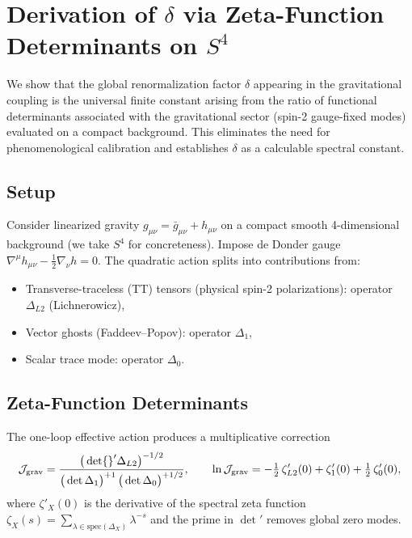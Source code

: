 \documentclass{article}
\numberwithin{equation}{section}
\theoremstyle{plain}
\theoremstyle{definition}
\theoremstyle{remark}
\begin{document}
\section{Derivation of \texorpdfstring{$\delta$}{δ} via Zeta-Function Determinants on \texorpdfstring{$S^4$}{S4}}
\label{app:zeta_S4}

We show that the global renormalization factor $\delta$ appearing in the gravitational coupling is the universal finite constant arising from the ratio of functional determinants associated with the gravitational sector (spin-2 gauge-fixed modes) evaluated on a compact background. This eliminates the need for phenomenological calibration and establishes $\delta$ as a calculable spectral constant.

\subsection{Setup}
Consider linearized gravity $g_{\mu\nu}=\bar{g}_{\mu\nu}+h_{\mu\nu}$ on a compact smooth 4-dimensional background (we take $S^4$ for concreteness). Impose de Donder gauge $\nabla^\mu h_{\mu\nu}-\tfrac{1}{2}\nabla_\nu h=0$. The quadratic action splits into contributions from:
\begin{itemize}
    \item Transverse-traceless (TT) tensors (physical spin-2 polarizations): operator $\Delta_{L2}$ (Lichnerowicz),
    \item Vector ghosts (Faddeev–Popov): operator $\Delta_1$,
    \item Scalar trace mode: operator $\Delta_0$.
\end{itemize}

\subsection{Zeta-Function Determinants}
The one-loop effective action produces a multiplicative correction
\begin{equation}
\mathcal{J}_{\rm grav}
= \frac{\big(\det{}' \Delta_{L2}\big)^{-1/2}}{\big(\det \Delta_{1}\big)^{+1}\,\big(\det \Delta_{0}\big)^{+1/2}},
\qquad
\ln \mathcal{J}_{\rm grav}
= -\tfrac{1}{2}\,\zeta'_{L2}(0)+\zeta'_1(0)+\tfrac{1}{2}\,\zeta'_0(0),
\label{eq:Jgrav_def}
\end{equation}
where $\zeta'_X(0)$ is the derivative of the spectral zeta function $\zeta_X(s)=\sum_{\lambda\in \text{spec}(\Delta_X)} \lambda^{-s}$ and the prime in $\det{}'$ removes global zero modes.
\end{document}
